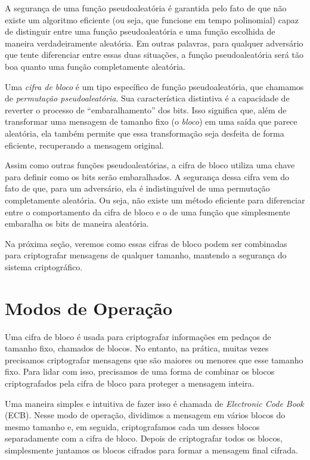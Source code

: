 A segurança de uma função pseudoaleatória é garantida pelo fato de que não existe um algoritmo eficiente (ou seja, que funcione em tempo polinomial) capaz de distinguir entre uma função pseudoaleatória e uma função escolhida de maneira verdadeiramente aleatória.
Em outras palavras, para qualquer adversário que tente diferenciar entre essas duas situações, a função pseudoaleatória será tão boa quanto uma função completamente aleatória.

Uma {\em cifra de bloco} é um tipo específico de função pseudoaleatória, que chamamos de {\em permutação pseudoaleatória}.
Sua característica distintiva é a capacidade de reverter o processo de ``embaralhamento'' dos bits.
Isso significa que, além de transformar uma mensagem de tamanho fixo (o {\em bloco}) em uma saída que parece aleatória, ela também permite que essa transformação seja desfeita de forma eficiente, recuperando a mensagem original.

Assim como outras funções pseudoaleatórias, a cifra de bloco utiliza uma chave para definir como os bits serão embaralhados.
A segurança dessa cifra vem do fato de que, para um adversário, ela é indistinguível de uma permutação completamente aleatória.
Ou seja, não existe um método eficiente para diferenciar entre o comportamento da cifra de bloco e o de uma função que simplesmente embaralha os bits de maneira aleatória.

Na próxima seção, veremos como essas cifras de bloco podem ser combinadas para criptografar mensagens de qualquer tamanho, mantendo a segurança do sistema criptográfico.

\section{Modos de Operação}
\label{sec:modos-de-operacao-bloco}

Uma cifra de bloco é usada para criptografar informações em pedaços de tamanho fixo, chamados de blocos.
No entanto, na prática, muitas vezes precisamos criptografar mensagens que são maiores ou menores que esse tamanho fixo.
Para lidar com isso, precisamos de uma forma de combinar os blocos criptografados pela cifra de bloco para proteger a mensagem inteira.

Uma maneira simples e intuitiva de fazer isso é chamada de {\em Electronic Code Book} (ECB).
Nesse modo de operação, dividimos a mensagem em vários blocos do mesmo tamanho e, em seguida, criptografamos cada um desses blocos separadamente com a cifra de bloco.
Depois de criptografar todos os blocos, simplesmente juntamos os blocos cifrados para formar a mensagem final cifrada.

